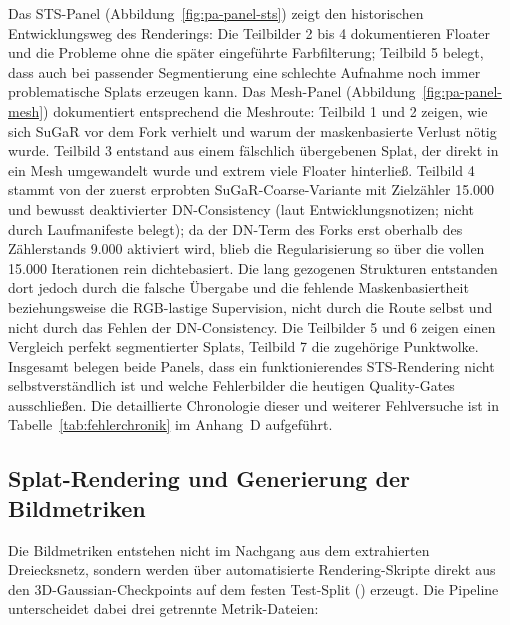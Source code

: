 Das STS-Panel (Abbildung~\ref{fig:pa-panel-sts}) zeigt den historischen
Entwicklungsweg des Renderings: Die Teilbilder 2 bis 4 dokumentieren Floater
und die Probleme ohne die später eingeführte Farbfilterung; Teilbild 5 belegt,
dass auch bei passender Segmentierung eine schlechte Aufnahme noch immer
problematische Splats erzeugen kann. Das Mesh-Panel
(Abbildung~\ref{fig:pa-panel-mesh}) dokumentiert entsprechend die Meshroute:
Teilbild 1 und 2 zeigen, wie sich SuGaR vor dem Fork verhielt und warum der
maskenbasierte Verlust nötig wurde. Teilbild 3 entstand aus einem fälschlich
übergebenen Splat, der direkt in ein Mesh umgewandelt wurde und extrem viele
Floater hinterließ. Teilbild 4 stammt von der zuerst erprobten
SuGaR-Coarse-Variante mit Zielzähler 15.000 und bewusst deaktivierter
DN-Consistency (laut Entwicklungsnotizen; nicht durch Laufmanifeste belegt);
da der DN-Term des Forks erst oberhalb des Zählerstands 9.000
aktiviert wird, blieb die Regularisierung so über die vollen 15.000
Iterationen rein dichtebasiert. Die lang gezogenen Strukturen entstanden dort
jedoch durch die falsche Übergabe und die fehlende Maskenbasiertheit
beziehungsweise die RGB-lastige Supervision, nicht durch die Route selbst und
nicht durch das Fehlen der DN-Consistency. Die Teilbilder 5 und 6
zeigen einen Vergleich perfekt segmentierter Splats, Teilbild 7 die
zugehörige Punktwolke. Insgesamt belegen beide Panels, dass ein
funktionierendes STS-Rendering nicht selbstverständlich ist und welche
Fehlerbilder die heutigen Quality-Gates ausschließen. Die detaillierte
Chronologie dieser und weiterer Fehlversuche ist in
Tabelle~\ref{tab:fehlerchronik} im Anhang~D aufgeführt.
\subsection{Splat-Rendering und Generierung der Bildmetriken}

Die Bildmetriken entstehen nicht im Nachgang aus dem extrahierten Dreiecksnetz,
sondern werden über automatisierte Rendering-Skripte direkt aus den
3D-Gaussian-Checkpoints auf dem festen Test-Split ()
erzeugt. Die Pipeline unterscheidet dabei drei getrennte Metrik-Dateien:

